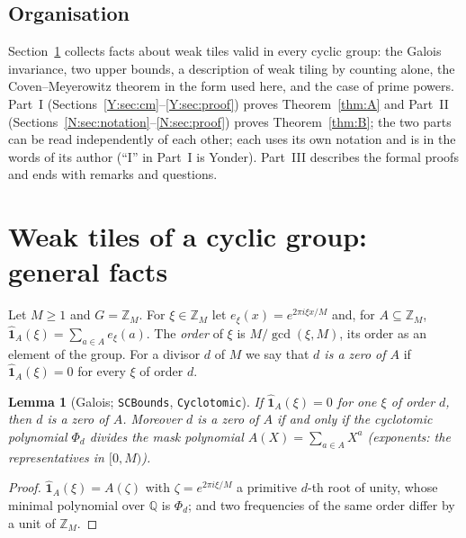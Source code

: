 \documentclass[11pt,a4paper]{amsart}
\newtheorem{lemma}[theorem]{Lemma}
\theoremstyle{definition}
\theoremstyle{remark}
\newcommand{\Z}{\mathbb{Z}}
\newcommand{\Q}{\mathbb{Q}}
\newcommand{\one}{\mathbf{1}}
\newcommand{\lean}[1]{\texttt{#1}}
\begin{document}
\subsection*{Organisation} Section~\ref{N:sec:general} collects facts about weak tiles valid in every cyclic
group: the Galois invariance, two upper bounds, a description of weak tiling by counting alone, the
Coven--Meyerowitz theorem in the form used here, and the case of prime powers. Part~I
(Sections~\ref{Y:sec:cm}--\ref{Y:sec:proof}) proves Theorem~\ref{thm:A} and Part~II
(Sections~\ref{N:sec:notation}--\ref{N:sec:proof}) proves Theorem~\ref{thm:B}; the two parts can be read
independently of each other; each uses its own notation and is in the words of its author (``I'' in Part~I
is Yonder). Part~III describes the formal proofs and ends with
remarks and questions.

\section{Weak tiles of a cyclic group: general facts}\label{N:sec:general}

Let $M\ge 1$ and $G=\Z_M$. For $\xi\in\Z_M$ let $e_\xi(x)=e^{2\pi i\xi x/M}$ and, for $A\subseteq\Z_M$,
$\hat{\one}_A(\xi)=\sum_{a\in A}e_\xi(a)$. The \emph{order} of $\xi$ is $M/\gcd(\xi,M)$, its order as an element
of the group. For a divisor $d$ of $M$ we say that \emph{$d$ is a zero of $A$} if $\hat{\one}_A(\xi)=0$ for
every $\xi$ of order $d$.

\begin{lemma}[Galois; \lean{SCBounds}, \lean{Cyclotomic}]\label{N:lem:gal}
If $\hat{\one}_A(\xi)=0$ for one $\xi$ of order $d$, then $d$ is a zero of $A$. Moreover $d$ is a zero of $A$ if
and only if the cyclotomic polynomial $\Phi_d$ divides the mask polynomial $A(X)=\sum_{a\in A}X^a$ (exponents: the
representatives in $[0,M)$).
\end{lemma}
\begin{proof}
$\hat{\one}_A(\xi)=A(\zeta)$ with $\zeta=e^{2\pi i\xi/M}$ a primitive $d$-th root of unity, whose minimal
polynomial over $\Q$ is $\Phi_d$; and two frequencies of the same order differ by a unit of $\Z_M$.
\end{proof}
\end{document}
